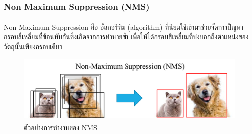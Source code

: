 \subsubsection{Non Maximum Suppression (NMS)}
Non Maximum Suppression\textsuperscript{\cite{nms}} คือ อัลกอริทึม (algorithm) ที่นิยมใช้เข้ามาช่วยจัดการปัญหากรอบสี่เหลี่ยมที่ซ้อนทับกันซึ่งเกิดจากการทำนายซ้ำ เพื่อให้ได้กรอบสี่เหลี่ยมที่บ่งบอกถึงตำแหน่งของวัตถุนั้นเพียงกรอบเดียว 
\begin{figure}[!ht]
	\centering
	\includegraphics[scale=0.3]{chapter2/images/NMS.png}
		\caption[ตัวอย่างการทำงานของ NMS]{ตัวอย่างการทำงานของ NMS\textsuperscript{\cite{nms_pic}}}
    	\label{fig:NMS}
\end{figure}

